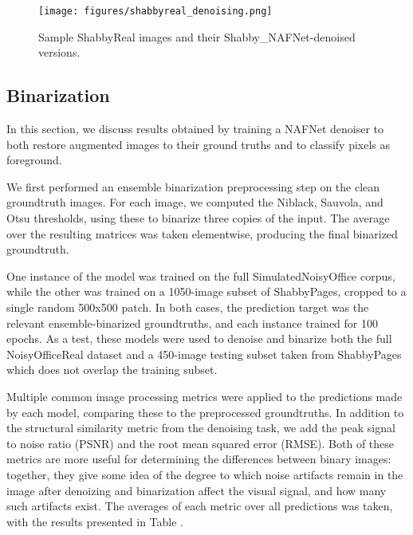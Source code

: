 \documentclass[runningheads]{llncs}
\begin{document}
\begin{figure}
\centering
\texttt{[image: figures/shabbyreal\_denoising.png]}
\caption{Sample ShabbyReal images and their Shabby\_NAFNet-denoised versions.}
\label{fig:shabbyreal_denoising}
\end{figure}

\subsection{Binarization}
In this section, we discuss results obtained by training a NAFNet denoiser to both restore augmented images to their ground truths and to classify pixels as foreground.

We first performed an ensemble binarization preprocessing step on the clean groundtruth images.
For each image, we computed the Niblack, Sauvola, and Otsu thresholds, using these to binarize three copies of the input. The average over the resulting matrices was taken elementwise, producing the final binarized groundtruth.

One instance of the model was trained on the full SimulatedNoisyOffice corpus, while the other was trained on a 1050-image subset of ShabbyPages, cropped to a single random 500x500 patch. In both cases, the prediction target was the relevant ensemble-binarized groundtruths, and each instance trained for 100 epochs.
As a test, these models were used to denoise and binarize both the full NoisyOfficeReal dataset and a 450-image testing subset taken from ShabbyPages which does not overlap the training subset.

Multiple common image processing metrics were applied to the predictions made by each model, comparing these to the preprocessed groundtruths.
In addition to the structural similarity metric from the denoising task, we add the peak signal to noise ratio (PSNR) and the root mean squared error (RMSE). Both of these metrics are more useful for determining the differences between binary images: together, they give some idea of the degree to which noise artifacts remain in the image after denoizing and binarization affect the visual signal, and how many such artifacts exist.
The averages of each metric over all predictions was taken, with the results presented in Table \cite{tab:binarization_results}.

\begin{table}[]
    \centering
    \caption{Document image binarization performance of a NAFNet model trained and tested on ShabbyPages and NoisyOffice.}
    \label{tab:binarization_results}
\end{table}
\end{document}
